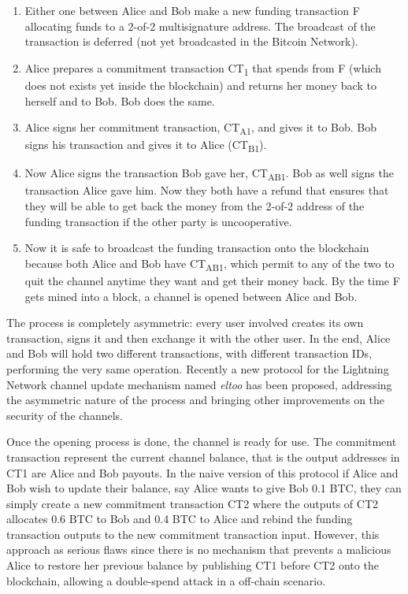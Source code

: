 		\begin{enumerate}
			\item Either one between Alice and Bob make a new funding transaction F allocating funds to a 2-of-2 multisignature address. The broadcast of the transaction is deferred (not yet broadcasted in the Bitcoin Network).
			
			\item Alice prepares a commitment transaction CT\textsubscript{1} that spends from F (which does not exists yet inside the blockchain) and returns her money back to herself and to Bob. Bob does the same.
			
			\item Alice signs her commitment transaction, CT\textsubscript{A1}, and gives it to Bob. Bob signs his transaction and gives it to Alice (CT\textsubscript{B1}). 
			
			\item Now Alice signs the transaction Bob gave her, CT\textsubscript{AB1}. Bob as well signs the transaction Alice gave him. Now they both have a refund that ensures that they will be able to get back the money from the 2-of-2 address of the funding transaction if the other party is uncooperative.
			
			\item Now it is safe to broadcast the funding transaction onto the blockchain because both Alice and Bob have CT\textsubscript{AB1}, which permit to any of the two to quit the channel anytime they want and get their money back. By the time F gets mined into a block, a channel is opened between Alice and Bob.
		\end{enumerate}
		
		The process is completely asymmetric: every user involved creates its own transaction, signs it and then exchange it with the other user. In the end, Alice and Bob will hold two different transactions, with different transaction IDs, performing the very same operation. Recently a new protocol for the Lightning Network channel update mechanism named \textit{eltoo}\cite{Decker} has been proposed, addressing the asymmetric nature of the process and bringing other improvements on the security of the channels.
		
		Once the opening process is done, the channel is ready for use. The commitment transaction represent the current channel balance, that is the output addresses in CT1 are Alice and Bob payouts. In the naive version of this protocol if Alice and Bob wish to update their balance, say Alice wants to give Bob 0.1 BTC, they can simply create a new commitment transaction CT2 where the outputs of CT2 allocates 0.6 BTC to Bob and 0.4 BTC to Alice and rebind the funding transaction outputs to the new commitment transaction input. However, this approach as serious flaws since there is no mechanism that prevents a malicious Alice to restore her previous balance by publishing CT1 before CT2 onto the blockchain, allowing a double-spend attack in a off-chain scenario.
		
